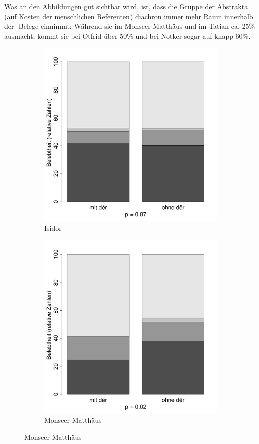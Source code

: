 Was an den Abbildungen gut sichtbar wird, ist, dass die Gruppe der Abstrakta (auf Kosten der menschlichen Referenten) diachron immer mehr Raum innerhalb der -Belege einnimmt: Während sie im Monseer Matthäus und im Tatian ca. 25\% ausmacht, kommt sie bei Otfrid über 50\% und bei Notker sogar auf knapp 60\%. 

\begin{figure}
\begin{subfigure}[b]{.5\linewidth}
  \includegraphics[width=6 cm]{generated/images/belebtheit-I}
\caption {Isidor}
\end{subfigure}%
\begin{subfigure}[b]{.5\linewidth}
  \includegraphics[width=6 cm]{generated/images/belebtheit-M}
\caption {Monseer Matthäus}
\end{subfigure}


\end{figure}
